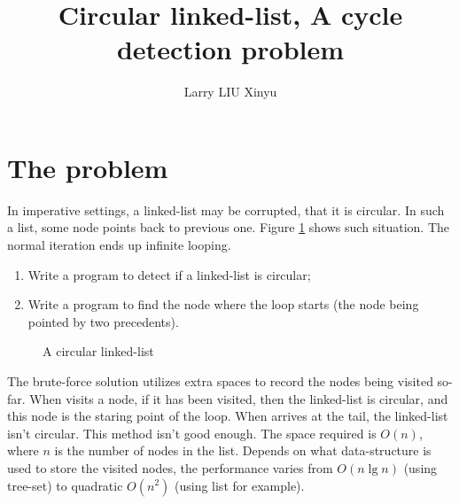 \documentclass{article}
\begin{document}
\title{Circular linked-list, A cycle detection problem}
\author{Larry LIU Xinyu}
\maketitle

\section{The problem}

In imperative settings, a linked-list may be corrupted, that it is circular. In such a list, some node
points back to previous one. Figure \ref{fig:circular-list} shows such situation.
The normal iteration ends up infinite looping.
  \begin{enumerate}
    \item Write a program to detect if a linked-list is circular;
    \item Write a program to find the node where the loop starts (the node being pointed by two precedents).
  \end{enumerate}

\begin{figure}[htbp]
\centering
{}
\caption{A circular linked-list}
\label{fig:circular-list}
\end{figure}

The brute-force solution utilizes extra spaces to record the nodes being visited so-far.
When visits a node, if it has been visited, then the linked-list is circular, and this
node is the staring point of the loop. When arrives at the tail, the linked-list isn't
circular. This method isn't good enough. The space required is $O(n)$, where $n$ is the
number of nodes in the list. Depends on what data-structure is used to store
the visited nodes, the performance varies from $O(n \lg n)$ (using tree-set) to quadratic $O(n^2)$
(using list for example).
\end{document}
